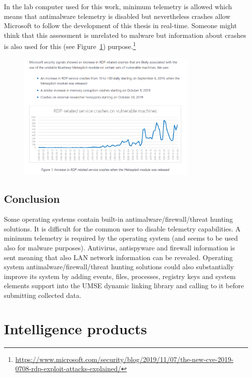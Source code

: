In the lab computer used for this work, minimum telemetry is allowed which
means that antimalware telemetry is disabled but nevertheless crashes allow
Microsoft to follow the development of this thesis in real-time. Someone might
think that this assessment is unrelated to malware but information about
crashes is also used for this\cite{MicrosoftRdpCrashes2019} (see Figure~\ref{fig:rdp})
purpose.\footnote{\href{https://www.microsoft.com/security/blog/2019/11/07/the-new-cve-2019-0708-rdp-exploit-attacks-explained/}{https://www.microsoft.com/security/blog/2019/11/07/the-new-cve-2019-0708-rdp-exploit-attacks-explained/}}
\begin{figure}[h]
  \centering
  \includegraphics[width=0.8\textwidth]{./figures/RDP}
  \caption{\label{fig:rdp}}
\end{figure}

\subsection{Conclusion}

Some operating systems contain built-in antimalware/firewall/threat hunting
solutions. It is difficult for the common user to disable telemetry
capabilities. A minimum telemetry is required by the operating system (and
seems to be used also for malware purposes). Antivirus, antispyware and
firewall information is sent meaning that also LAN network information can be
revealed.  Operating system antimalware/firewall/threat hunting solutions
could also substantially improve its system by adding events, files,
processes, registry keys and system elements support into the UMSE dynamic
linking library and calling to it before submitting collected data.

\section{Intelligence products}


